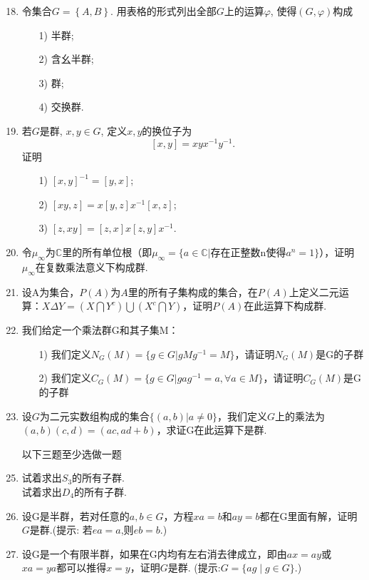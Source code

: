 \documentclass[a4paper,12pt]{article}
\begin{document}
\begin{enumerate}\setcounter{enumi}{17}
    \item 令集合$G=\left\{A,B\right\}$. 用表格的形式列出全部$G$上的运算$\varphi$, 使得$\left(G,\varphi\right)$构成
 \begin{itemize}
 \item[1)] 半群;
 \item[2)] 含幺半群;
 \item[3)] 群;
 \item[4)] 交换群.
 \end{itemize}
 \item 若$G$是群, $x,y\in G$, 定义$x,y$的换位子为
 $$\left[x,y\right]=xyx^{-1}y^{-1}.$$
 证明
 \begin{itemize}
 \item[1)] $\left[x,y\right]^{-1}=\left[y,x\right]$;
 \item[2)] $\left[xy,z\right]=x\left[y,z\right]x^{-1}\left[x,z\right]$;
 \item[3)] $\left[z,xy\right]=\left[z,x\right]x\left[z,y\right]x^{-1}$.
 \end{itemize}
 \item 令$\mu_{\infty}$为$\mathbb{C}$里的所有单位根（即$\mu_{\infty}=\{a\in \mathbb{C}|\text{存在正整数n使得} a^n=1\}$），证明$\mu_{\infty}$在复数乘法意义下构成群.
 \item 设A为集合，$P(A)$为$A$里的所有子集构成的集合，在$P(A)$上定义二元运算：$X\Delta Y=(X\bigcap Y^c)\bigcup (X^c \bigcap Y)$，证明$P(A)$在此运算下构成群.
 \item 我们给定一个乘法群G和其子集M：
 \begin{itemize}
     \item[1)] 我们定义$N_G(M)=\{g\in G| gMg^{-1}=M\}$，请证明$N_G(M)$是G的子群
     \item[2)] 我们定义$C_G(M)=\{g\in G| gag^{-1}=a,\forall a\in M\}$，请证明$C_G(M)$是G的子群
 \end{itemize}
 \item 设$G$为二元实数组构成的集合$\{(a,b)|a\neq 0\}$，我们定义$G$上的乘法为$(a,b)(c,d)=(ac,ad+b)$，求证G在此运算下是群.
 \item[] {\color{red}以下三题至少选做一题}
  \item 试着求出$S_3$的所有子群.\\
 试着求出$D_4$的所有子群.
 \item 设G是半群，若对任意的$a,b\in G$，方程$xa=b$和$ay=b$都在G里面有解，证明$G$是群.(提示: 若$ea=a$,则$eb=b$.)
 \item 设G是一个有限半群，如果在G内均有左右消去律成立，即由$ax=ay$或$xa=ya$都可以推得$x=y$，证明$G$是群. (提示:$G=\{ag\mid g\in G\}$.)
 
\end{enumerate}
\end{document}
